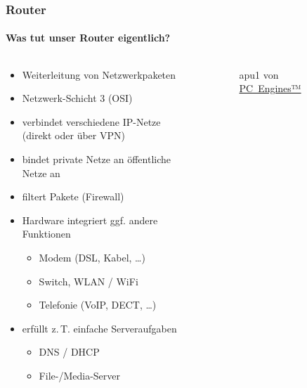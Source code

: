 \documentclass[t]{beamer}
\begin{document}
\begin{frame}
    \frametitle{Router}
    \framesubtitle{Was tut unser Router eigentlich?}
    \begin{columns}[T,onlytextwidth]
        \begin{column}{0.65\textwidth}
            \begin{itemize}
                \item Weiterleitung von Netzwerkpaketen
                \item Netzwerk-Schicht 3 (OSI)
                \item verbindet verschiedene IP-Netze\\(direkt oder über VPN)
                \item bindet private Netze an öffentliche Netze an
                \item filtert Pakete (Firewall)
                \item Hardware integriert ggf. andere Funktionen
                    \begin{itemize}
                        \item Modem (DSL, Kabel, …)
                        \item Switch, WLAN / WiFi
                        \item Telefonie (VoIP, DECT, …)
                    \end{itemize}
                \item erfüllt z.\,T. einfache Serveraufgaben
                    \begin{itemize}
                        \item DNS / DHCP
                        \item File-/Media-Server
                    \end{itemize}
            \end{itemize}
        \end{column}
        \begin{column}{0.35\textwidth}
            \begin{figure}
                \caption{apu1 von \href{https://pcengines.ch/apu.htm}{PC~Engines™}}
            \end{figure}
        \end{column}
    \end{columns}
\end{frame}
\end{document}
